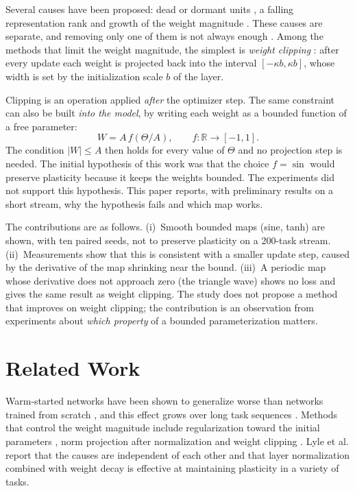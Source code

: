 \documentclass[conference,a4paper]{IEEEtran}
\begin{document}
Several causes have been proposed: dead or dormant units \cite{sokar2023dormant,abbas2023loss}, a falling
representation rank \cite{lyle2022understanding,dohare2024loss} and growth of the weight magnitude
\cite{dohare2024loss,elsayed2024weight,lyle2024normalization}. These causes are separate, and removing only one of them is not always enough \cite{lyle2024disentangling}. Among the methods that limit the weight magnitude, the simplest is \emph{weight
clipping} \cite{elsayed2024weight}: after every update each weight is projected back into the interval
$[-\kappa b,\kappa b]$, whose width is set by the initialization scale $b$ of the layer.

Clipping is an operation applied \emph{after} the optimizer step. The same constraint can also be built \emph{into the model}, by writing each weight as a bounded function of a free parameter:
\begin{equation}
  W = A\, f(\Theta/A), \qquad f:\mathbb{R}\to[-1,1]. \label{eq:reparam}
\end{equation}
The condition $|W|\le A$ then holds for every value of $\Theta$ and no projection step is needed. The initial
hypothesis of this work was that the choice $f=\sin$ would preserve plasticity because it keeps the weights
bounded. The experiments did not support this hypothesis. This paper reports, with preliminary results on a
short stream, why the hypothesis fails and which map works.

The contributions are as follows. (i)~Smooth bounded maps (sine, tanh) are shown, with ten paired seeds, not to
preserve plasticity on a 200-task stream. (ii)~Measurements show that this is consistent with a smaller update step, caused by the derivative of the map shrinking near the bound. (iii)~A periodic map whose derivative
does not approach zero (the triangle wave) shows no loss and gives the same result as weight clipping. The study
does not propose a method that improves on weight clipping; the contribution is an observation from experiments about
\emph{which property} of a bounded parameterization matters.

\section{Related Work}

Warm-started networks have been shown to generalize worse than networks trained from scratch \cite{ash2020warm},
and this effect grows over long task sequences \cite{dohare2024loss}. Methods that
control the weight magnitude include regularization toward the initial parameters \cite{kumar2023maintaining},
norm projection after normalization \cite{lyle2024normalization} and weight clipping \cite{elsayed2024weight}.
Lyle et al. \cite{lyle2024disentangling} report that the causes are independent of each other and that layer normalization combined with weight decay is effective at maintaining plasticity in a variety of tasks.
\end{document}

